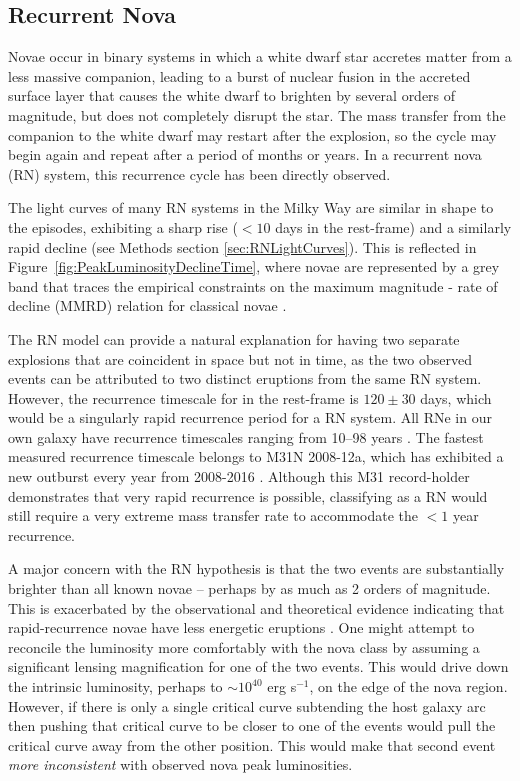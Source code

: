 \subsection{Recurrent Nova}\label{sec:RNe}

Novae occur in binary systems in which a white dwarf star accretes
matter from a less massive companion, leading to a burst of nuclear
fusion in the accreted surface layer that causes the white dwarf to
brighten by several orders of magnitude, but does not completely
disrupt the star. The mass transfer from the companion to the white
dwarf may restart after the explosion, so the cycle may begin again
and repeat after a period of months or years.  In a recurrent nova
(RN) system, this recurrence cycle has been directly observed.

The light curves of many RN systems in the Milky Way are similar in
shape to the \spock episodes, exhibiting a sharp rise ($<10$ days in
the rest-frame) and a similarly rapid decline (see Methods section
\ref{sec:RNLightCurves}).  This is reflected in
Figure~\ref{fig:PeakLuminosityDeclineTime}, where novae are
represented by a grey band that traces the empirical constraints on
the maximum magnitude - rate of decline (MMRD) relation for classical
novae \citep{DellaValle:1995, Downes:2000, Shafter:2011,
  Kasliwal:2011a}.

The RN model can provide a natural explanation for having two separate
explosions that are coincident in space but not in time, as the two
observed \spock events can be attributed to two distinct eruptions
from the same RN system.  However, the recurrence timescale for \spock
in the rest-frame is $120\pm30$ days, which would be a singularly
rapid recurrence period for a RN system.  All RNe in our own galaxy
have recurrence timescales ranging from 10--98 years
\citep{Schaefer:2010}.  The fastest measured recurrence timescale
belongs to M31N 2008-12a, which has exhibited a new outburst every
year from 2008-2016
\citep{Tang:2014,Darnley:2014,Darnley:2015,Henze:2015,Henze:2015a,Darnley:2016}. Although
this M31 record-holder demonstrates that very rapid recurrence is
possible, classifying \spock as a RN would still require a very
extreme mass transfer rate to accommodate the $<1$ year recurrence.

A major concern with the RN hypothesis is that the two \spock events
are substantially brighter than all known novae -- perhaps by as much
as 2 orders of magnitude.  This is exacerbated by the observational
and theoretical evidence indicating that rapid-recurrence novae have
less energetic eruptions \citep[e.g.][]{Yaron:2005}.  One might
attempt to reconcile the \spock luminosity more comfortably with the
nova class by assuming a significant lensing magnification for one of
the two events. This would drive down the intrinsic luminosity,
perhaps to $\sim10^{40}$ erg s$^{-1}$, on the edge of the nova region.
However, if there is only a single critical curve subtending the
\spock host galaxy arc then pushing that critical curve to be closer
to one of the \spock events would pull the critical curve away from
the other \spock position. This would make that second event {\it more
  inconsistent} with observed nova peak luminosities.


